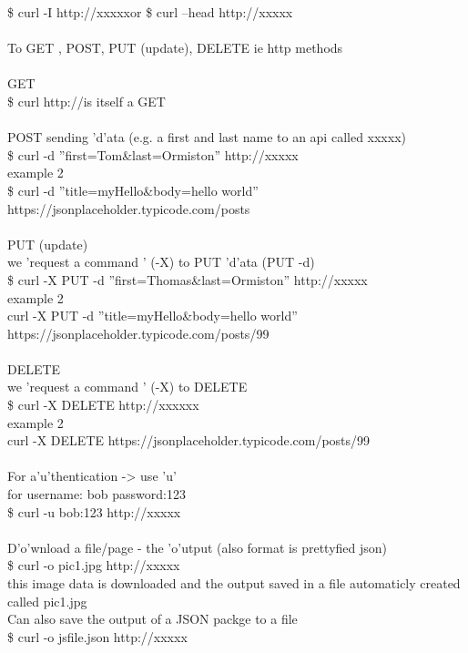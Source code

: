 \documentclass[10pt,a4paper]{article}
\begin{document}
{{{{{{{{{\$ curl -I http://xxxxx}{\large       or    \$ curl --head http://xxxxx}{\large  \\
\\
To GET , POST, PUT (update), DELETE  ie http methods\\
\\
GET\\
\$ curl http://}{\large     is itself a GET\\
\\
POST sending 'd'ata (e.g. a first and last name to an api called xxxxx)\\
\$ curl -d ''first=Tom\&last=Ormiston'' http://}{\large  xxxxx\\
example 2\\
\$ curl -d ''title=myHello\&body=hello world'' https://jsonplaceholder.typicode.com/posts}{\large    \\
\\
PUT (update)\\
we 'request a command ' (-X) to PUT 'd'ata (PUT -d)\\
\$ curl -X PUT -d ''first=Thomas\&last=Ormiston'' http://}{\large  xxxxx\\
example 2\\
curl -X PUT -d ''title=myHello\&body=hello world'' https://jsonplaceholder.typicode.com/posts/99}{\large \\
\\
DELETE\\
we 'request a command ' (-X) to DELETE \\
\$ curl -X DELETE http://xxxxxx}{\large \\
example 2\\
 curl -X DELETE https://jsonplaceholder.typicode.com/posts/99}{\large   \\
\\
For a'u'thentication  -> use 'u'\\
for   username: bob      password:123\\
\$ curl -u bob:123  http://xxxxx}{\large \\
\\
D'o'wnload a file/page - the 'o'utput (also format is prettyfied json)\\
\$ curl -o pic1.jpg http://xxxxx}{\large \\
this image data is downloaded and the output saved in a file automaticly created called pic1.jpg\\
Can also save the output of a JSON packge to a file\\
\$ curl -o jsfile.json http://xxxxx}{\large \\
}}}}}}}}}
\end{document}
